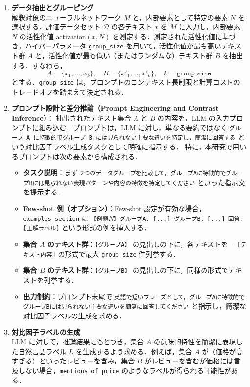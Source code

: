 \begin{enumerate}
\item \textbf{データ抽出とグルーピング} \\
解釈対象のニューラルネットワーク $M$ と，内部要素として特定の要素 $N$ を選択する．評価データセット $\mathcal{D}$ の各テキスト $x$ を $M$ に入力し，内部要素 $N$ の活性化値 $\text{activation}(x, N)$ を測定する．測定された活性化値に基づき，ハイパーパラメータ \texttt{group\_size} を用いて，活性化値が最も高いテキスト群 $A$ と，活性化値が最も低い（またはランダムな）テキスト群 $B$ を抽出する．すなわち，
 \[
   A = \{ x_1, \dots, x_k \}, \quad
   B = \{ x'_1, \dots, x'_k \}, \quad
   k = \texttt{group\_size}
 \]
 とする．\texttt{group\_size} は，プロンプトのコンテキスト長制限と計算コストのトレードオフを踏まえて決定される．
 \item \textbf{プロンプト設計と差分推論（Prompt Engineering and Contrast Inference）}：
 抽出されたテキスト集合 $A$ と $B$ の内容を，LLM の入力プロンプトに組み込む．プロンプトは，LLM に対し，単なる要約ではなく \texttt{グループ A に特徴的でグループ B には見られない主要な違いを特定し，簡潔に回答する} という対比因子ラベル生成タスクとして明確に指示する．
 特に，本研究で用いるプロンプトは次の要素から構成される．
 \begin{itemize}
  \item \textbf{タスク説明}：まず \texttt{2つのデータグループを比較して，グループAに特徴的でグループBには見られない表現パターンや内容の特徴を特定してください} といった指示文を提示する．
  \item \textbf{Few-shot 例（オプション）}：Few-shot 設定が有効な場合，\texttt{examples\_section} に \texttt{【例題$N$】グループA: [...] グループB: [...] 回答: [正解ラベル]} という形式の例を挿入する．
  \item \textbf{集合 $A$ のテキスト群}：\texttt{【グループA】} の見出しの下に，各テキストを \texttt{- [テキスト内容]} の形式で最大 \texttt{group\_size} 件列挙する．
  \item \textbf{集合 $B$ のテキスト群}：\texttt{【グループB】} の見出しの下に，同様の形式でテキストを列挙する．
  \item \textbf{出力制約}：プロンプト末尾で \texttt{英語で短いフレーズとして，グループAに特徴的でグループBには見られない主要な違いを簡潔に回答してください} と指示し，簡潔な対比因子ラベルの生成を求める．
 \end{itemize}
 
 \item \textbf{対比因子ラベルの生成} \\
 LLM に対して，推論結果にもとづき，集合 $A$ の意味的特性を簡潔に表現した自然言語ラベル $L$ を生成するよう求める．例えば，集合 $A$ が（価格が高すぎる）といったレビューを含み，集合 $B$ がレビューを含むが価格には言及しない場合，\texttt{mentions of price} のようなラベルが得られる可能性がある．
\end{enumerate}

